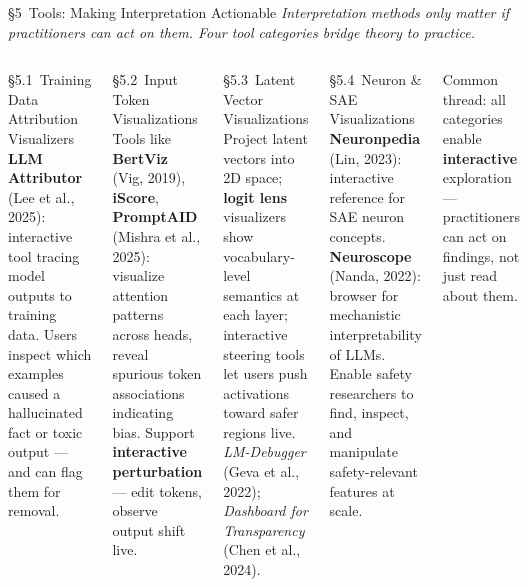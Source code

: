 

\begin{frame}{\S5\ Tools: Making Interpretation Actionable}
  {\footnotesize\itshape Interpretation methods only matter if practitioners can act on them. Four tool categories bridge theory to practice.}
  \vspace{0.3em}
  \begin{columns}[T]
    \begin{ucrcard}[UCRnavy]{\S5.1\ Training Data Attribution Visualizers}
      \scriptsize
      \textbf{LLM Attributor} (Lee et al., 2025): interactive tool tracing model outputs to training data. Users inspect which examples caused a hallucinated fact or toxic output --- and can flag them for removal.
    \end{ucrcard}\vspace{3pt}
    \begin{ucrcard}[UCRnavy]{\S5.2\ Input Token Visualizations}
      \scriptsize
      Tools like \textbf{BertViz} (Vig, 2019), \textbf{iScore}, \textbf{PromptAID} (Mishra et al., 2025): visualize attention patterns across heads, reveal spurious token associations indicating bias. Support \textbf{interactive perturbation} --- edit tokens, observe output shift live.
    \end{ucrcard}

    \begin{ucrcard}[UCRnavy]{\S5.3\ Latent Vector Visualizations}
      \scriptsize
      Project latent vectors into 2D space; \textbf{logit lens} visualizers show vocabulary-level semantics at each layer; interactive steering tools let users push activations toward safer regions live. \textit{LM-Debugger} (Geva et al., 2022); \textit{Dashboard for Transparency} (Chen et al., 2024).
    \end{ucrcard}\vspace{3pt}
    \begin{ucrcard}[UCRnavy]{\S5.4\ Neuron \& SAE Visualizations}
      \scriptsize
      \textbf{Neuronpedia} (Lin, 2023): interactive reference for SAE neuron concepts. \textbf{Neuroscope} (Nanda, 2022): browser for mechanistic interpretability of LLMs. Enable safety researchers to find, inspect, and manipulate safety-relevant features at scale.
    \end{ucrcard}
    \vspace{0.2em}
    \begin{ucrinfo}
      \centering\scriptsize
      Common thread: all categories enable \textbf{interactive} exploration --- practitioners can act on findings, not just read about them.
    \end{ucrinfo}
  \end{columns}
\end{frame}


